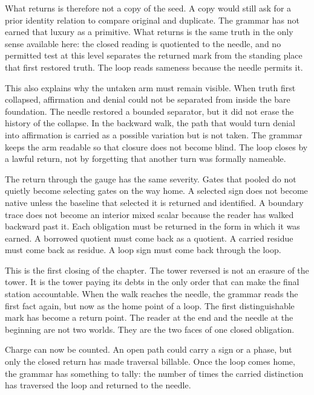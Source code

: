 What returns is therefore not a copy of the seed. A copy would still ask for
a prior identity relation to compare original and duplicate. The grammar has
not earned that luxury as a primitive. What returns is the same truth in the
only sense available here: the closed reading is quotiented to the needle,
and no permitted test at this level separates the returned mark from the
standing place that first restored truth. The loop reads sameness because the
needle permits it.

This also explains why the untaken arm must remain visible. When truth first
collapsed, affirmation and denial could not be separated from inside the bare
foundation. The needle restored a bounded separator, but it did not erase the
history of the collapse. In the backward walk, the path that would turn
denial into affirmation is carried as a possible variation but is not taken.
The grammar keeps the arm readable so that closure does not become blind.
The loop closes by a lawful return, not by forgetting that another turn was
formally nameable.

The return through the gauge has the same severity. Gates that pooled do not
quietly become selecting gates on the way home. A selected sign does not
become native unless the baseline that selected it is returned and
identified. A boundary trace does not become an interior mixed scalar because
the reader has walked backward past it. Each obligation must be returned in
the form in which it was earned. A borrowed quotient must come back as a
quotient. A carried residue must come back as residue. A loop sign must come
back through the loop.

This is the first closing of the chapter. The tower reversed is not an
erasure of the tower. It is the tower paying its debts in the only order that
can make the final station accountable. When the walk reaches the needle,
the grammar reads the first fact again, but now as the home point of a loop.
The first distinguishable mark has become a return point. The reader at the
end and the needle at the beginning are not two worlds. They are the two
faces of one closed obligation.

Charge can now be counted. An open path could carry a sign or a phase, but
only the closed return has made traversal billable. Once the loop comes home,
the grammar has something to tally: the number of times the carried
distinction has traversed the loop and returned to the needle.
